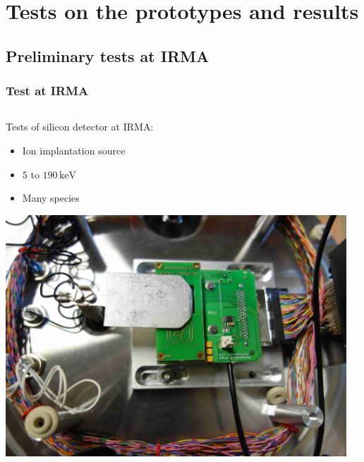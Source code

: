 \section{Tests on the prototypes and results}
\subsection{Preliminary tests at IRMA}
\begin{frame}
  \frametitle{Test at IRMA}
  \begin{columns}
    \begin{column}{0.45\textwidth}
      Tests of silicon detector at IRMA:
      \begin{itemize}
        \item Ion implantation source
        \item $5$ to $190\,\mathrm{keV}$
        \item Many species
      \end{itemize}
      \includegraphics[width=\textwidth]{04_Test/fig/fig000_IRMA_setup01.jpg}
    \end{column}
    \begin{column}{0.45\textwidth}
      \begin{columns}
        \begin{column}{0.45\textwidth}

\end{column}
\end{columns}
\end{column}
\end{columns}
\end{frame}
